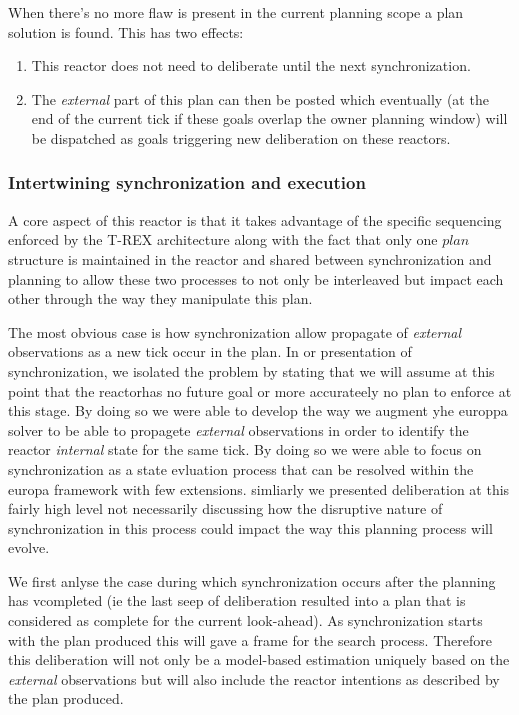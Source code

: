 When there's no more flaw is present in the current planning scope a
plan  solution is found. This has two effects:
\begin{enumerate}
\item This reactor does not need to deliberate until the next synchronization.
\item The {\em external} part of this plan can then be posted which
  eventually (at the end of the current tick if these goals overlap
  the owner planning window) will be dispatched as goals triggering
  new deliberation on these reactors.
\end{enumerate}

\subsubsection{Intertwining synchronization and execution}
\label{sec:arch:intertwine}

A core aspect of this reactor is that it takes advantage of the
specific sequencing enforced by the T-REX architecture along with the
fact that only one $plan$ structure is maintained in the reactor and
shared between synchronization and planning to allow these two processes
to not only be interleaved but impact each other through the way they
manipulate this plan.  

The most obvious case is how synchronization allow propagate of {\em
  external} observations as a new tick occur in the plan. In or
presentation of synchronization, we isolated the problem by stating
that we will assume at this point that the reactorhas no future goal
or more accurateely no plan to enforce at this stage. By doing so we
were able to develop the way we augment yhe europpa solver to be able
to propagete {\em external} observations in order to identify the
reactor {\em internal} state for the same tick. By doing so we were
able to focus on synchronization as a state evluation process that can
be resolved within the europa framework with few extensions. simliarly
we presented deliberation at this fairly high level not necessarily
discussing how the disruptive nature of synchronization in this
process could impact the way this planning process will evolve. 

We first anlyse the case during which synchronization occurs after the
planning has vcompleted (ie the last seep of deliberation resulted into
a plan that is considered as complete for the current look-ahead). As
synchronization starts with  the plan produced this will gave a frame
for the search process. Therefore this deliberation will not only be a
model-based estimation uniquely based on the {\em external}
observations but will also include the reactor intentions as described
by the plan produced. 






